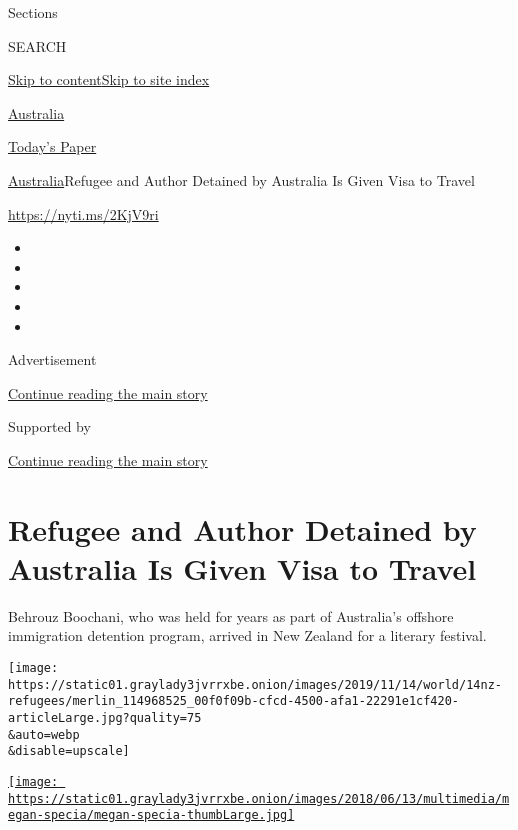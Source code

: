 Sections

SEARCH

\protect\hyperlink{site-content}{Skip to
content}\protect\hyperlink{site-index}{Skip to site index}

\href{https://www.nytimes3xbfgragh.onion/section/world/australia}{Australia}

\href{https://myaccount.nytimes3xbfgragh.onion/auth/login?response_type=cookie\&client_id=vi}{}

\href{https://www.nytimes3xbfgragh.onion/section/todayspaper}{Today's
Paper}

\href{/section/world/australia}{Australia}\textbar{}Refugee and Author
Detained by Australia Is Given Visa to Travel

\href{https://nyti.ms/2KjV9ri}{https://nyti.ms/2KjV9ri}

\begin{itemize}
\item
\item
\item
\item
\item
\end{itemize}

Advertisement

\protect\hyperlink{after-top}{Continue reading the main story}

Supported by

\protect\hyperlink{after-sponsor}{Continue reading the main story}

\hypertarget{refugee-and-author-detained-by-australia-is-given-visa-to-travel}{%
\section{Refugee and Author Detained by Australia Is Given Visa to
Travel}\label{refugee-and-author-detained-by-australia-is-given-visa-to-travel}}

Behrouz Boochani, who was held for years as part of Australia's offshore
immigration detention program, arrived in New Zealand for a literary
festival.

\texttt{[image: https://static01.graylady3jvrrxbe.onion/images/2019/11/14/world/14nz-refugees/merlin\_114968525\_00f0f09b-cfcd-4500-afa1-22291e1cf420-articleLarge.jpg?quality=75\\\&auto=webp\\\&disable=upscale]}

\href{https://www.nytimes3xbfgragh.onion/by/megan-specia}{\texttt{[image: https://static01.graylady3jvrrxbe.onion/images/2018/06/13/multimedia/megan-specia/megan-specia-thumbLarge.jpg]}}

